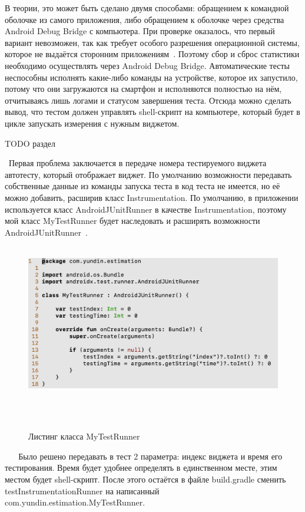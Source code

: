 \documentclass[a4paper,14pt]{extarticle} %
\begin{document}
	В теории, это может быть сделано двумя способами: обращением к командной оболочке из самого приложения, либо обращением к оболочке через средства Android Debug Bridge с компьютера. При проверке оказалось, что первый вариант невозможен, так как требует особого разрешения операционной системы, которое не выдаётся сторонним приложениям~\parencite{Dump_Permission}. Поэтому сбор и сброс статистики необходимо осуществлять через Android Debug Bridge. Автоматические тесты неспособны исполнять какие-либо команды на устройстве, которое их запустило, потому что они загружаются на смартфон и исполняются полностью на нём, отчитываясь лишь логами и статусом завершения теста. Отсюда можно сделать вывод, что тестом должен управлять shell-скрипт на компьютере, который будет в цикле запускать измерения с нужным виджетом.
	
	{\huge TODO раздел}
	
	 Первая проблема заключается в передаче номера тестируемого виджета автотесту, который отображает виджет. По умолчанию возможности передавать собственные данные из команды запуска теста в код теста не имеется, но её можно добавить, расширив класс Instrumentation. По умолчанию, в приложении используется класс AndroidJUnitRunner в качестве Instrumentation, поэтому мой класс MyTestRunner будет наследовать и расширять возможности AndroidJUnitRunner~\ris{\ref{fig:mytestrunner}}.
	 
	 \begin{figure}[tbh]
	 	\includegraphics[width=\textwidth]{mytestrunner}
	 	\vspace{-0.7cm}
	 	\caption{Листинг класса MyTestRunner}
	 	\label{fig:mytestrunner}
	 \end{figure}
 
 	Было решено передавать в тест 2 параметра: индекс виджета и время его тестирования. Время будет удобнее определять в единственном месте, этим местом будет shell-скрипт. После этого остаётся в файле build.gradle сменить testInstrumentationRunner на написанный com.yundin.estimation.MyTestRunner.
	
\end{document}
